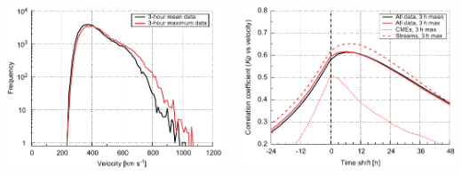 \documentclass[11pt,aspectratio=1610]{beamer}	%
\newcommand{\captionoftiny}[2]{\captionof{#1}{\color{gray} \tiny #2}}
\begin{document}
\begin{frame}[c]{}{}
	\begin{columns}[c]
		
		\includegraphics[width=\textwidth]{../figures_of_mine/chapter2/histogram_V_d.pdf}


		\includegraphics[width=\textwidth]{../figures_of_mine/chapter2/cc_lag_sws_f.pdf}
	
	\end{columns}
\end{frame}
\end{document}
